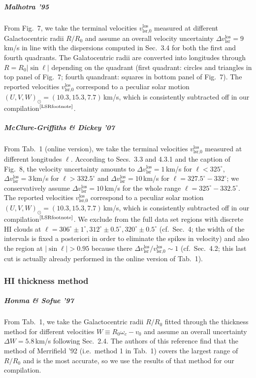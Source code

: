 \documentclass[twocolumn,prd,reprint,preprintnumbers,amsmath,amssymb,superscriptaddress,nofootinbib]{revtex4}
\begin{document}
\subparagraph{Malhotra '95 \cite{Malhotra1995}} From Fig.~7, we take the terminal velocities $v_{\textrm{lsr,0}}^{\textrm{los}}$ measured at different Galactocentric radii $R/R_0$ and assume an overall velocity uncertainty $\Delta v_{\textrm{lsr}}^{\textrm{los}}=9\,$km/s in line with the dispersions computed in Sec.~3.4 for both the first and fourth quadrants. The Galatocentric radii are converted into longitudes through $R=R_0|\sin\ell|$ depending on the quadrant (first quadrant: circles and triangles in top panel of Fig.~7; fourth quandrant: squares in bottom panel of Fig.~7). The reported velocities $v_{\textrm{lsr,0}}^{\textrm{los}}$ correspond to a peculiar solar motion $(U,V,W)_{\odot}=(10.3,15.3,7.7)\,$km/s, which is consistently subtracted off in our compilation$^\text{\ref{LSRfootnote}}$. 


\subparagraph{McClure-Griffiths \& Dickey '07 \cite{McClure-GriffithsDickey2007}} From Tab.~1 (online version), we take the terminal velocities $v_{\textrm{lsr,0}}^{\textrm{los}}$ measured at different longitudes $\ell$. According to Secs.~3.3 and 4.3.1 and the caption of Fig.~8, the velocity uncertainty amounts to $\Delta v_{\textrm{lsr}}^{\textrm{los}}=1\,$km/s for $\ell<325^{\circ}$, $\Delta v_{\textrm{lsr}}^{\textrm{los}}=3\,$km/s for $\ell>332.5^{\circ}$ and $\Delta v_{\textrm{lsr}}^{\textrm{los}}=10\,$km/s for $\ell=327.5^{\circ}-332^{\circ}$; we conservatively assume $\Delta v_{\textrm{lsr}}^{\textrm{los}}=10\,$km/s for the whole range $\ell=325^{\circ}-332.5^{\circ}$. The reported velocities $v_{\textrm{lsr,0}}^{\textrm{los}}$ correspond to a peculiar solar motion $(U,V,W)_{\odot}=(10.3,15.3,7.7)\,$km/s, which is consistently subtracted off in our compilation$^\text{\ref{LSRfootnote}}$. We exclude from the full data set regions with discrete HI clouds at $\ell=306^{\circ}\pm 1^{\circ},312^{\circ}\pm 0.5^{\circ},320^{\circ}\pm 0.5^{\circ}$ (cf.~Sec.~4; the width of the intervals is fixed a posteriori in order to eliminate the spikes in velocity) and also the region at $|\sin\ell|>0.95$ because there $\Delta v_{\textrm{lsr}}^{\textrm{los}} / v_{\textrm{lsr,0}}^{\textrm{los}}\sim 1$ (cf.~Sec.~4.2; this last cut is actually already performed in the online version of Tab.~1).


\subsubsection{HI thickness method}

\subparagraph{Honma \& Sofue '97 \cite{HonmaSofue1997}} From Tab.~1, we take the Galactocentric radii $R/R_0$ fitted through the thickness method for different velocities $W\equiv R_0\omega_c -v_0$ and assume an overall uncertainty $\Delta W=5.8\,$km/s following Sec.~2.4. The authors of this reference find that the method of Merrifield '92 \cite{1992AJ....103.1552M} (i.e.~method 1 in Tab.~1) covers the largest range of $R/R_0$ and is the most accurate, so we use the results of that method for our compilation.
\end{document}
